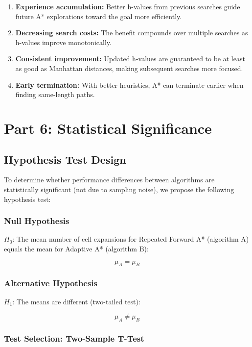 \documentclass[12pt]{article}
\begin{document}
\begin{enumerate}
    \item \textbf{Experience accumulation:} Better h-values from previous searches guide future 
    A* explorations toward the goal more efficiently.
    
    \item \textbf{Decreasing search costs:} The benefit compounds over multiple searches as 
    h-values improve monotonically.
    
    \item \textbf{Consistent improvement:} Updated h-values are guaranteed to be at least as 
    good as Manhattan distances, making subsequent searches more focused.
    
    \item \textbf{Early termination:} With better heuristics, A* can terminate earlier when 
    finding same-length paths.
\end{enumerate}


\section{Part 6: Statistical Significance}

\subsection{Hypothesis Test Design}

To determine whether performance differences between algorithms are statistically significant 
(not due to sampling noise), we propose the following hypothesis test:

\subsubsection{Null Hypothesis}

$H_0$: The mean number of cell expansions for Repeated Forward A* (algorithm A) equals the mean 
for Adaptive A* (algorithm B):

$$\mu_A = \mu_B$$

\subsubsection{Alternative Hypothesis}

$H_1$: The means are different (two-tailed test):

$$\mu_A \neq \mu_B$$

\subsubsection{Test Selection: Two-Sample T-Test}
\end{document}
